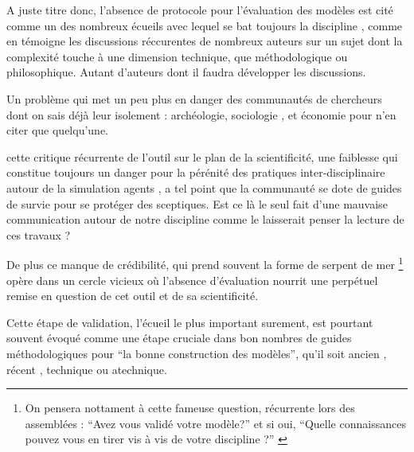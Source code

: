 A juste titre donc, l'absence de protocole pour l'évaluation des modèles est cité comme un des nombreux écueils avec lequel se bat toujours la discipline \autocite{Heath2009}, comme en témoigne les discussions réccurentes de nombreux auteurs sur un sujet dont la complexité touche à une dimension technique, que méthodologique ou philosophique. Autant d'auteurs \autocite{Richiardi2006} \autocite{Fagiolo2007} \autocite{Moss2008} \autocite{Windrum2007} \autocite{Barlas1996} \autocite{Amblard2003} \autocite{OSullivan2004} \autocite{Doran2000} \autocite{Crooks2012} \autocite{Rouchier2013} dont il faudra développer les discussions.  

Un problème qui met un peu plus en danger des communautés de chercheurs dont on sais déjà leur isolement : archéologie, sociologie \autocite{Manzo2007}, et économie \autocite{Lehtinen2007} \autocite{Richiardi2006} pour n'en citer que quelqu'une. 

cette critique récurrente de l'outil sur le plan de la scientificité, une faiblesse qui constitue toujours un danger pour la pérénité des pratiques inter-disciplinaire autour de la simulation agents \autocite[220]{Squazzoni2010}, a tel point que la communauté se dote de guides de survie pour se protéger des sceptiques. \autocite{Waldherr2013} Est ce là le seul fait d'une mauvaise communication autour de notre discipline comme le laisserait penser la lecture de ces travaux ? 

De plus ce manque de crédibilité, qui prend souvent la forme de serpent de mer \footnote{ On pensera nottament à cette fameuse question, récurrente lors des assemblées : \enquote{Avez vous validé votre modèle?} et si oui, \enquote{Quelle connaissances pouvez vous en tirer vis à vis de votre discipline ?} \autocite{Amblard2006} } opère dans un cercle vicieux où l'absence d'évaluation nourrit une perpétuel remise en question de cet outil et de sa scientificité. %

Cette étape de validation, l'écueil le plus important surement, est pourtant souvent évoqué comme une étape cruciale dans bon nombres de guides méthodologiques pour \enquote{la bonne construction des modèles}, qu'il soit ancien \autocite[195]{Beshers1965} \autocite{Naylor1966, Naylor1967}, récent \autocite{Amblard2006, Gilbert2008}, technique ou atechnique. 

